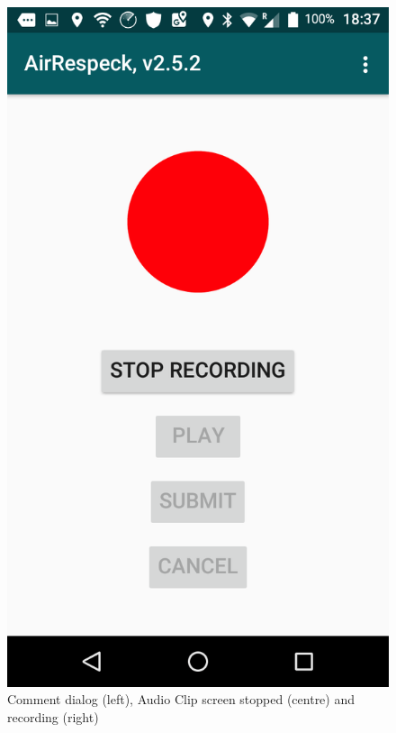 \begin{figure}[H]
\begin{minipage}[b]{0.33\linewidth}
    \includegraphics[width=.8\linewidth]{images/recording} 
    \vspace{3ex}
  \end{minipage} 
  \caption{Comment dialog (left), Audio Clip screen stopped (centre) and recording (right)}
  \label{fig:extras}

\end{figure}


